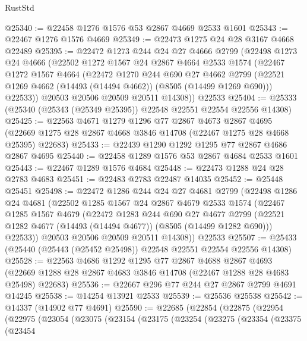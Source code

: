 \begin{lexlean}{RustStd}
\begin{coremodule}
@25340 := @22458 @1276 @1576 @53 @2867 @4669 @2533 @1601
@25343 := @22467 @1276 @1576 @4669
@25349 := @22473 @1275 @24 @28 @3167 @4668 @22489
@25395 := @22472
    @1273
    @244
    @24
    @27
    @4666
    @2799
    (@22498
      @1273
      @24
      @4666
      (@22502
        @1272
        @1567
        @24
        @2867
        @4664
        @2533
        @1574
        (@22467
          @1272
          @1567
          @4664
          (@22472
            @1270
            @244
            @690
            @27
            @4662
            @2799
            (@22521 @1269 @4662 (@14493 (@14494 @4662)) (@8505 (@14499 @1269 @690)))
            @22533))
        @20503
        @20506
        @20509
        @20511
        @14308))
    @22533
@25404 := @25333 (@25340 (@25343 (@25349 @25395)) @22548 @22551 @22554 @22556 @14308)
@25425 := @22563
    @4671
    @1279
    @1296
    @77
    @2867
    @4673
    @2867
    @4695
    (@22669 @1275 @28 @2867 @4668 @3846 @14708 (@22467 @1275 @28 @4668 @25395) @22683)
@25433 := @22439 @1290 @1292 @1295 @77 @2867 @4686 @2867 @4695
@25440 := @22458 @1289 @1576 @53 @2867 @4684 @2533 @1601
@25443 := @22467 @1289 @1576 @4684
@25448 := @22473 @1288 @24 @28 @2783 @4683
@25451 := @22483 @2783 @22487 @14035
@25452 := @25448 @25451
@25498 := @22472
    @1286
    @244
    @24
    @27
    @4681
    @2799
    (@22498
      @1286
      @24
      @4681
      (@22502
        @1285
        @1567
        @24
        @2867
        @4679
        @2533
        @1574
        (@22467
          @1285
          @1567
          @4679
          (@22472
            @1283
            @244
            @690
            @27
            @4677
            @2799
            (@22521 @1282 @4677 (@14493 (@14494 @4677)) (@8505 (@14499 @1282 @690)))
            @22533))
        @20503
        @20506
        @20509
        @20511
        @14308))
    @22533
@25507 := @25433 (@25440 (@25443 (@25452 @25498)) @22548 @22551 @22554 @22556 @14308)
@25528 := @22563
    @4686
    @1292
    @1295
    @77
    @2867
    @4688
    @2867
    @4693
    (@22669 @1288 @28 @2867 @4683 @3846 @14708 (@22467 @1288 @28 @4683 @25498) @22683)
@25536 := @22667 @296 @77 @244 @27 @2867 @2799 @4691 @14245
@25538 := @14254 @13921 @2533
@25539 := @25536 @25538
@25542 := @14337 (@14902 @77 @4691)
@25590 := @22685
    (@22854
      (@22875
        (@22954
          (@22975
            (@23054
              (@23075
                (@23154
                  (@23175
                    (@23254
                      (@23275
                        (@23354
                          (@23375
                            (@23454

\end{coremodule}
\end{lexlean}
